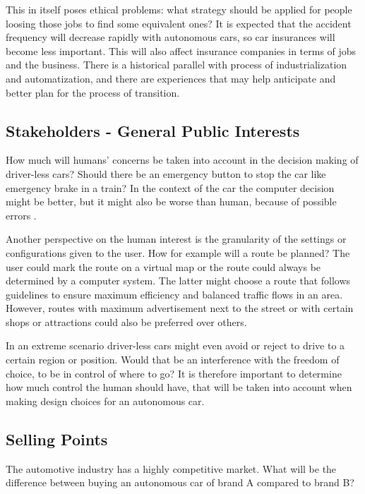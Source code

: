 This in itself poses ethical problems: what strategy should be applied for people loosing those jobs to find some equivalent ones? It is expected that the accident frequency will decrease rapidly with autonomous cars, so car insurances will become less important. This will also affect insurance companies in terms of jobs and the business. There is a historical parallel with process of industrialization and automatization, and there are experiences that may help anticipate and better plan for the process of transition.


\subsection{Stakeholders - General Public Interests}
\label{sec:EAofNONTC:Stakeholders}

How much will humans’ concerns be taken into account in the decision making of driver-less cars? Should there be an emergency button to stop the car like emergency brake in a train? In the context of the car the computer decision might be better, but it might also be worse than human, because of possible errors \cite{Eckstein2016}.

Another perspective on the human interest is the granularity of the settings or configurations given to the user. How for example will a route be planned? The user could mark the route on a virtual map or the route could always be determined by a computer system. The latter might choose a route that follows guidelines to ensure maximum efficiency and balanced traffic flows in an area. However, routes with maximum advertisement next to the street or with certain shops or attractions could also be preferred over others. 

In an extreme scenario driver-less cars might even avoid or reject to drive to a certain region or position. Would that be an interference with the freedom of choice, to be in control of where to go? It is therefore important to determine how much control the human should have, that will be taken into account when making design choices for an autonomous car. 


\subsection{Selling Points}
\label{sec:EAofNONTC:SellingPoints}

The automotive industry has a highly competitive market. What will be the difference between buying an autonomous car of brand A compared to brand B? 

